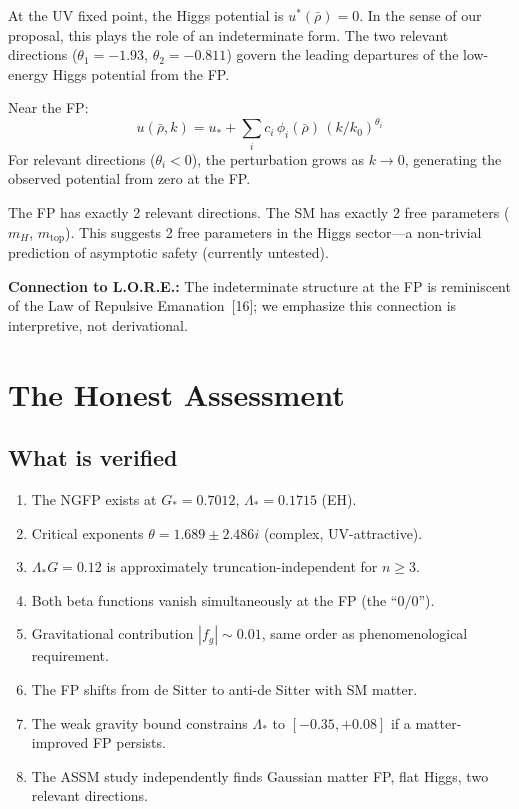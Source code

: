 \documentclass[12pt]{article}
\begin{document}
At the UV fixed point, the Higgs potential is $u^*(\bar\rho)=0$. In the sense of our proposal, this plays the role of an indeterminate form. The two relevant directions ($\theta_1=-1.93$, $\theta_2=-0.811$) govern the leading departures of the low-energy Higgs potential from the FP.

Near the FP:
\begin{equation}
u(\bar\rho,k) = u_* + \sum_i c_i\,\phi_i(\bar\rho)\,(k/k_0)^{\theta_i}
\end{equation}
For relevant directions ($\theta_i<0$), the perturbation grows as $k\to0$, generating the observed potential from zero at the FP.

The FP has exactly 2 relevant directions. The SM has exactly 2 free parameters ($m_H$, $m_{\text{top}}$). This suggests 2 free parameters in the Higgs sector---a non-trivial prediction of asymptotic safety (currently untested).

\textbf{Connection to L.O.R.E.:} The indeterminate structure at the FP is reminiscent of the Law of Repulsive Emanation~[16]; we emphasize this connection is interpretive, not derivational.

\section{The Honest Assessment}

\subsection{What is verified}

\begin{enumerate}
\item The NGFP exists at $G_*=0.7012$, $\Lambda_*=0.1715$ (EH).
\item Critical exponents $\theta=1.689\pm2.486i$ (complex, UV-attractive).
\item $\Lambda_*G=0.12$ is approximately truncation-independent for $n\ge3$.
\item Both beta functions vanish simultaneously at the FP (the ``$0/0$'').
\item Gravitational contribution $|f_g|\sim0.01$, same order as phenomenological requirement.
\item The FP shifts from de Sitter to anti-de Sitter with SM matter.
\item The weak gravity bound constrains $\Lambda_*$ to $[-0.35,+0.08]$ if a matter-improved FP persists.
\item The ASSM study independently finds Gaussian matter FP, flat Higgs, two relevant directions.
\end{enumerate}
\end{document}

